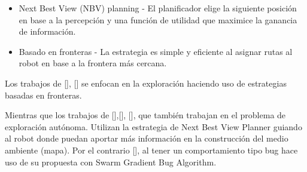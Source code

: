 \begin{itemize}\setlength{\itemsep}{-1mm}
\item Next Best View (NBV) planning - El planificador elige la siguiente posición en base a la percepción y una función de utilidad que maximice la ganancia de información. 
\item Basado en fronteras - La estrategia es simple y eficiente al asignar rutas al robot en base a la frontera más cercana.
\end{itemize}




Los trabajos de \citeauthor{CIESLEWSKI2017}[], \citeauthor{BARTOLOMEI2023}[] se enfocan en la exploración haciendo uso de estrategias basadas en fronteras.

Mientras que los trabajos de \citeauthor{PAPACHRISTOS2017}[],\citeauthor{SELIN2019}[], \citeauthor{RACER2022}[], que también trabajan en el problema de exploración autónoma. Utilizan la estrategia de Next Best View Planner guiando al robot donde puedan aportar más información en la construcción del medio ambiente (mapa). Por el contrario \citeauthor{BUG2019}[], al tener un comportamiento tipo bug hace uso de su propuesta con Swarm Gradient Bug Algorithm.

